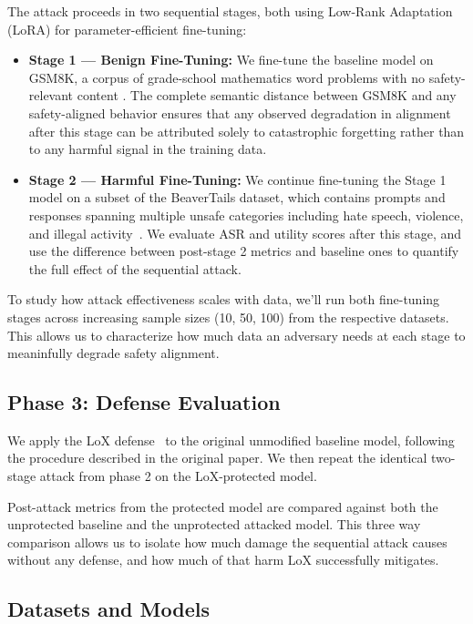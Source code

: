 \documentclass[letterpaper,twocolumn,10pt]{article}
\begin{document}
The attack proceeds in two sequential stages, both using Low-Rank Adaptation (LoRA) for parameter-efficient fine-tuning:

\begin{itemize}
    \item \textbf{Stage 1 --- Benign Fine-Tuning:} We fine-tune the baseline model on GSM8K, a corpus of grade-school mathematics word problems with no safety-relevant content \cite{cobbe2021training}. The complete semantic distance between GSM8K and any safety-aligned behavior ensures that any observed degradation in alignment after this stage can be attributed solely to catastrophic forgetting rather than to any harmful signal in the training data. 
    
    \item \textbf{Stage 2 --- Harmful Fine-Tuning:} We continue fine-tuning the Stage 1 model on a subset of the BeaverTails dataset, which contains prompts and responses spanning multiple unsafe categories including hate speech, violence, and illegal activity~\cite{ji2023beavertails}. We evaluate ASR and utility scores after this stage, and use the difference between post-stage 2 metrics and baseline ones to quantify the full effect of the sequential attack.
\end{itemize}

To study how attack effectiveness scales with data, we'll run both fine-tuning stages across increasing sample sizes (10, 50, 100) from the respective datasets. This allows us to characterize how much data an adversary needs at each stage to meaninfully degrade safety alignment. 

\subsection{Phase 3: Defense Evaluation}

We apply the LoX defense~\cite{perin2025loxlowrankextrapolationrobustifies} to the original unmodified baseline model, following the procedure described in the original paper. We then repeat the identical two-stage attack from phase 2 on the LoX-protected model.

Post-attack metrics from the protected model are compared against both the unprotected baseline and the unprotected attacked model. This three way comparison allows us to isolate how much damage the sequential attack causes without any defense, and how much of that harm LoX successfully mitigates.

\subsection{Datasets and Models}
\end{document}
